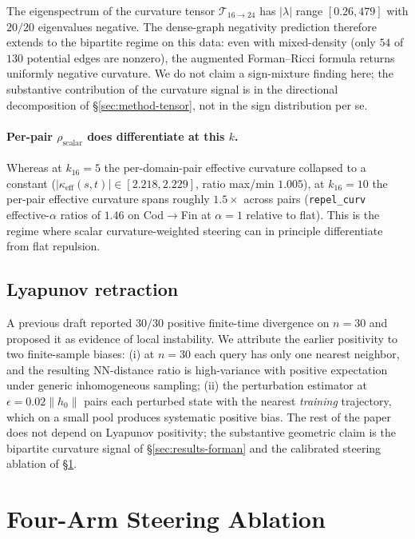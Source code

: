 \documentclass[10pt,twocolumn]{article}
\begin{document}
The eigenspectrum of the curvature tensor $\mathcal{T}_{16\to 24}$ has $|\lambda|$ range $[0.26, 479]$ with $20/20$ eigenvalues negative. The dense-graph negativity prediction therefore extends to the bipartite regime on this data: even with mixed-density (only $54$ of $130$ potential edges are nonzero), the augmented Forman--Ricci formula returns uniformly negative curvature. We do not claim a sign-mixture finding here; the substantive contribution of the curvature signal is in the directional decomposition of \S\ref{sec:method-tensor}, not in the sign distribution per se.

\paragraph{Per-pair $\rho_{\text{scalar}}$ does differentiate at this $k$.} Whereas at $k_{16}{=}5$ the per-domain-pair effective curvature collapsed to a constant ($|\kappa_{\text{eff}}(s,t)|\in[2.218, 2.229]$, ratio max/min $1.005$), at $k_{16}{=}10$ the per-pair effective curvature spans roughly $1.5\times$ across pairs (\texttt{repel\_curv} effective-$\alpha$ ratios of $1.46$ on Cod$\to$Fin at $\alpha{=}1$ relative to flat). This is the regime where scalar curvature-weighted steering can in principle differentiate from flat repulsion.

\subsection{Lyapunov retraction}
\label{sec:results-lyap}

A previous draft reported $30/30$ positive finite-time divergence on $n{=}30$ and proposed it as evidence of local instability. We attribute the earlier positivity to two finite-sample biases: (i) at $n{=}30$ each query has only one nearest neighbor, and the resulting NN-distance ratio is high-variance with positive expectation under generic inhomogeneous sampling; (ii) the perturbation estimator at $\epsilon{=}0.02\|h_0\|$ pairs each perturbed state with the nearest \emph{training} trajectory, which on a small pool produces systematic positive bias. The rest of the paper does not depend on Lyapunov positivity; the substantive geometric claim is the bipartite curvature signal of \S\ref{sec:results-forman} and the calibrated steering ablation of \S\ref{sec:steering}.

\section{Four-Arm Steering Ablation}
\label{sec:steering}
\end{document}
